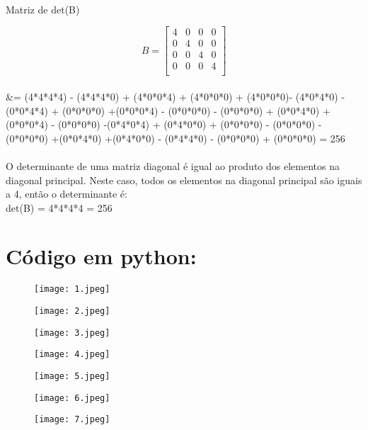 \documentclass{article}
\begin{document}
\\


Matriz de det(B) 

\begin{equation}
B = \begin{bmatrix}
4 & 0 & 0 & 0 \\
0 & 4 & 0 & 0 \\
0 & 0 & 4 & 0 \\
0 & 0 & 0 & 4 \\
\end{bmatrix}
\end{equation}
\\

&= (4*4*4*4) - (4*4*4*0) +  (4*0*0*4) + (4*0*0*0) + (4*0*0*0)- (4*0*4*0)
-(0*0*4*4) + (0*0*0*0) +(0*0*0*4) - (0*0*0*0) - (0*0*0*0) + (0*0*4*0) 
+ (0*0*0*4) - (0*0*0*0) -(0*4*0*4) + (0*4*0*0) + (0*0*0*0) - (0*0*0*0)
-(0*0*0*0) +(0*0*4*0) +(0*4*0*0) - (0*4*4*0) - (0*0*0*0) + (0*0*0*0) = 256\\  
\\
  O determinante de uma matriz diagonal é igual ao produto dos elementos na diagonal principal. Neste caso, todos os elementos na diagonal principal são iguais a 4, então o determinante é:\\

det(B) = 4*4*4*4 = 256 \\





\section*{Código em python:}

\begin{figure}[ht] 
    \texttt{[image: 1.jpeg]}   
\end{figure}
\begin{figure}[ht] 
    \texttt{[image: 2.jpeg]}   
\end{figure}
\begin{figure}[ht] 
    \texttt{[image: 3.jpeg]}   
\end{figure}
\begin{figure}[ht] 
    \texttt{[image: 4.jpeg]}   
\end{figure}
\begin{figure}[ht] 
    \texttt{[image: 5.jpeg]}   
\end{figure}
\begin{figure}[ht] 
    \texttt{[image: 6.jpeg]}   
\end{figure}
\begin{figure}[ht] 
    \texttt{[image: 7.jpeg]}   
\end{figure}
\end{document}
